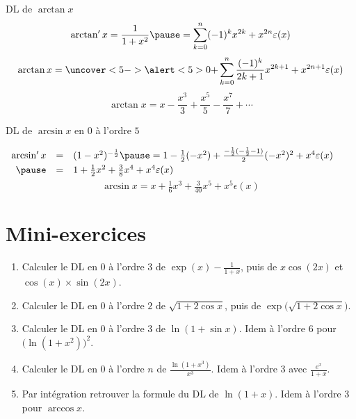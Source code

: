 \begin{frame}

\begin{exemple}
DL de $\arctan x$
{\small
\pause
\vspace*{-2ex}
$$\arctan' x=\frac{1}{1+x^2} \pause =\sum_{k=0}^{n}(-1)^kx^{2k}+x^{2n}\epsilon(x)$$
\pause
\vspace*{-1ex}
$$\arctan x= \uncover<5->{\alert<5>{0}+} \sum_{k=0}^{n}\frac{(-1)^k}{2k+1}x^{2k+1}+x^{2n+1}\epsilon(x)$$
\pause
\pause
\vspace*{-1ex}
$$\arctan x=x-\frac{x^3}{3}+\frac{x^5}{5}-\frac{x^7}{7} +\cdots$$
\vspace*{-2ex}
}
\end{exemple}

\pause

\begin{exemple}
DL de $\arcsin x$ en $0$ à l'ordre $5$
{\small
\pause

\vspace*{1ex}
\qquad 
$\begin{array}{rcl}
\arcsin' x 
 & = & (1-x^2)^{-\frac{1}{2}} \pause
=1-\frac{1}{2}(-x^2)
+\frac{-\frac{1}{2}(-\frac{1}{2}-1)}{2}(-x^2)^2+x^4\epsilon(x) \\
\pause
 & = & \vphantom{\Big(} 1+\frac{1}{2}x^2 + \frac{3}{8}x^4+x^4\epsilon(x)  \\
 \end{array}
$
\pause
\vspace*{-1ex}
$$\arcsin x =x+\tfrac{1}{6}x^3+\tfrac{3}{40}x^5+x^5\epsilon(x)$$
\vspace*{-2ex}
}
\end{exemple}

  
\end{frame}


\section{Mini-exercices}

\begin{frame}

\begin{miniexercice}
\begin{enumerate}
  \item Calculer le DL en $0$ à l'ordre $3$ de $\exp(x) -\frac{1}{1+x}$, puis de $x\cos(2x)$ et $\cos(x)\times \sin(2x)$.
  \item Calculer le DL en $0$ à l'ordre $2$ de $\sqrt{1+2\cos x}$, puis de $\exp\big(\sqrt{1+2\cos x}\big)$.
  \item Calculer le DL en $0$ à l'ordre $3$ de $\ln(1+\sin x)$. Idem à l'ordre $6$ pour $\big(\ln(1+x^2)\big)^2$.
  \item Calculer le DL en $0$ à l'ordre $n$ de $\frac{\ln(1+x^3)}{x^3}$. Idem à l'ordre $3$ avec $\frac{e^x}{1+x}$.
  \item Par intégration retrouver la formule du DL de $\ln(1+x)$. Idem à l'ordre $3$ pour $\arccos x$.
\end{enumerate}
\end{miniexercice}
\end{frame}

